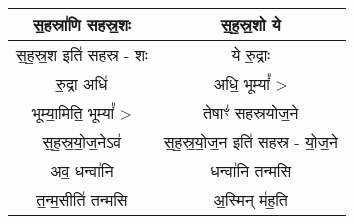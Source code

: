 \subsection{}
{\centering
\begin{longtable}{|c|c|}
\hline
स॒हस्रा॑णि सहस्र॒शः                & स॒ह॒स्र॒शो ये\\
\hline
स॒ह॒स्र॒श इति॑ सहस्र - शः           & ये रु॒द्राः\\
\hline
रु॒द्रा अधि॑                      & अधि॒ भूम्यां᳚ >\\
\hline
भूम्या॒मिति॒ भूम्यां᳚ >               & तेषाꣳ॑ सहस्रयोज॒ने\\
\hline
स॒ह॒स्र॒यो॒ज॒नेऽव॑                    & स॒ह॒स्र॒यो॒ज॒न इति॑ सहस्र - यो॒ज॒ने\\
\hline
अव॒ धन्वा॑नि                     & धन्वा॑नि तन्मसि\\
\hline
त॒न्म॒सीति॑ तन्मसि                 & अ॒स्मिन् म॑ह॒ति\\
\hline
\end{longtable}
}

